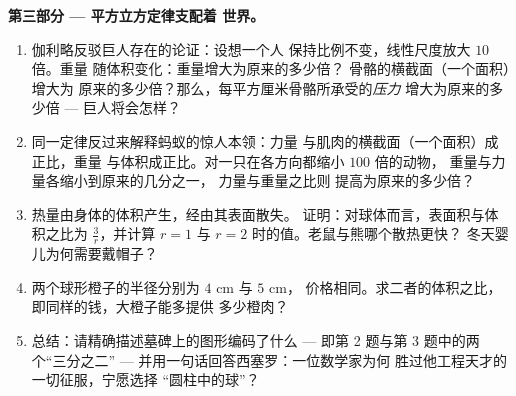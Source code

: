 \begin{problem}
\medskip
\noindent\textbf{第三部分 --- 平方立方定律支配着
世界。}
\begin{enumerate}[resume]
  \item 伽利略反驳巨人存在的论证：设想一个人
        保持比例不变，线性尺度放大 $10$ 倍。重量
        随体积变化：重量增大为原来的多少倍？
        骨骼的横截面（一个面积）增大为
        原来的多少倍？那么，每平方厘米骨骼所承受的\emph{压力}
        增大为原来的多少倍 ---
        巨人将会怎样？
  \item 同一定律反过来解释蚂蚁的惊人本领：力量
        与肌肉的横截面（一个面积）成正比，重量
        与体积成正比。对一只在各方向都缩小 $100$ 倍的动物，
        重量与力量各缩小到原来的几分之一，
        力量与重量之比则
        提高为原来的多少倍？
  \item 热量由身体的体积产生，经由其表面散失。
        证明：对球体而言，表面积与体积之比为
        $\frac{3}{r}$，并计算 $r = 1$ 与
        $r = 2$ 时的值。老鼠与熊哪个散热更快？
        冬天婴儿为何需要戴帽子？
  \item 两个球形橙子的半径分别为 $4$ cm 与 $5$ cm，
        价格相同。求二者的体积之比，
        即同样的钱，大橙子能多提供
        多少橙肉？
  \item 总结：请精确描述墓碑上的图形编码了什么
        --- 即第 2 题与第 3 题中的两个“三分之二”
        --- 并用一句话回答西塞罗：一位数学家为何
        胜过他工程天才的一切征服，宁愿选择
        “圆柱中的球”？
\end{enumerate}
\end{problem}
